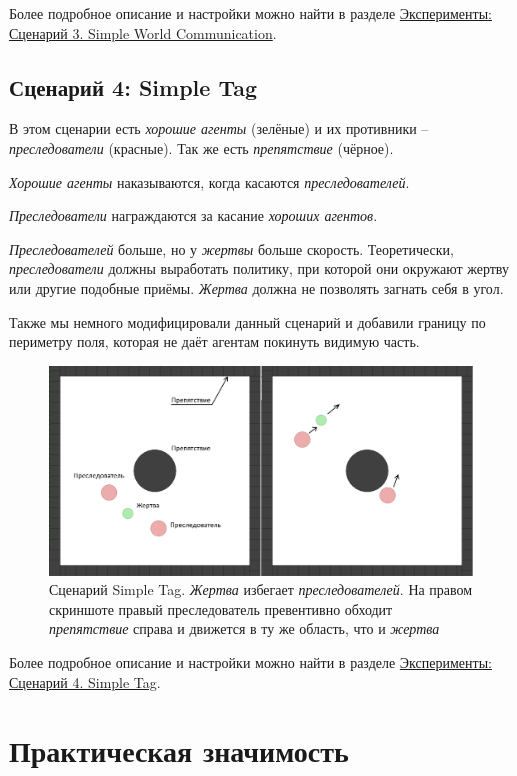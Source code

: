 Более подробное описание и настройки можно найти в разделе \hyperref[exp-swc]{Эксперименты: Сценарий 3. Simple World Communication}.

\subsection{Сценарий 4: Simple Tag} \label{intro-st}

В этом сценарии есть \textit{хорошие агенты} (зелёные) и их противники – \textit{преследователи} (красные). Так же есть \textit{препятствие} (чёрное).

\textit{Хорошие агенты} наказываются, когда касаются \textit{преследователей}.

\textit{Преследователи} награждаются за касание \textit{хороших агентов}.

\textit{Преследователей} больше, но у \textit{жертвы} больше скорость. Теоретически, \textit{преследователи} должны выработать политику, при которой они окружают жертву или другие подобные приёмы. \textit{Жертва} должна не позволять загнать себя в угол.

Также мы немного модифицировали данный сценарий и добавили границу по периметру поля, которая не даёт агентам покинуть видимую часть.

\begin{figure}[ht!] 
	\center
	\includegraphics [scale=0.41] {my_folder/images/intro/st.png}
	\caption{Сценарий Simple Tag. \textit{Жертва} избегает \textit{преследователей}. На правом скриншоте правый преследователь превентивно обходит \textit{препятствие} справа и движется в ту же область, что и \textit{жертва}}
	\label{fig:st}  
\end{figure}

Более подробное описание и настройки можно найти в разделе \hyperref[exp-st]{Эксперименты: Сценарий 4. Simple Tag}.

\section{Практическая значимость} \label{intro:sec3}

